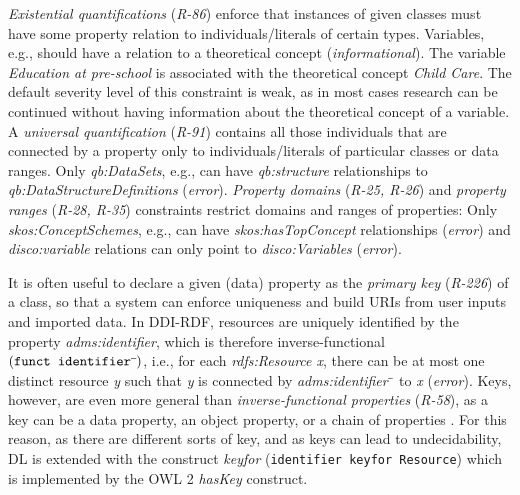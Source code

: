 \documentclass[conference]{IEEEtran}
\newcommand{\ms}[1]{\texttt{#1}}
\newenvironment{DL}{
  \small
  \vspace{0cm}
	\begin{center}
  \begin{tabular}{c l}

}{
  \end{tabular}
	\end{center}
}
\begin{document}
\emph{Existential quantifications} (\emph{R-86}) enforce that instances of given classes must have some property relation to individuals/literals of certain types.
Variables, e.g., should have a relation to a theoretical concept (\emph{informational}).
The variable \emph{Education at pre-school} is associated with the theoretical concept \emph{Child Care}. 
The default severity level of this constraint is weak, as in most cases research can be continued without having information about the theoretical concept of a variable.
%
A \emph{universal quantification} (\emph{R-91}) contains all those individuals that are connected by a property only to individuals/literals of particular classes  or data ranges.
Only \emph{qb:DataSets}, e.g., can have \emph{qb:structure} relationships to \emph{qb:DataStructureDefinitions} (\emph{error}).
\emph{Property domains} (\emph{R-25, R-26}) and \emph{property ranges} (\emph{R-28, R-35}) constraints restrict domains and ranges of properties:
Only \emph{skos:ConceptSchemes}, e.g., can have \emph{skos:hasTopConcept} relationships (\emph{error}) and \emph{disco:variable} relations can only point to \emph{disco:Variables} (\emph{error}).

It is often useful to declare a given (data) property as the \emph{primary key} (\emph{R-226}) of a class, so that a system can enforce uniqueness and build URIs from user inputs and imported data. 
In DDI-RDF, resources are uniquely identified by the property \emph{adms:identifier},
which is therefore inverse-functional $({\small\ms{funct identifier}\sp{\overline{\ }}})$,
i.e., for each \emph{rdfs:Resource x}, there can be at most one distinct resource \emph{y} such that \emph{y} is connected by \emph{adms:identifier$\sp{\overline{\ }}$} to \emph{x} (\emph{error}).
Keys, however, are even more general than \emph{inverse-functional properties} (\emph{R-58}),
as a key can be a data property, an object property, or a chain of properties \cite{Schneider2009}.
For this reason, as there are different sorts of key, and as keys can lead to undecidability, 
DL is extended with the construct \emph{keyfor} ({\small\ms{identifier \ms{keyfor} Resource}}) \cite{Lutz2005} which is implemented by the OWL 2 \emph{hasKey} construct.
\end{document}
